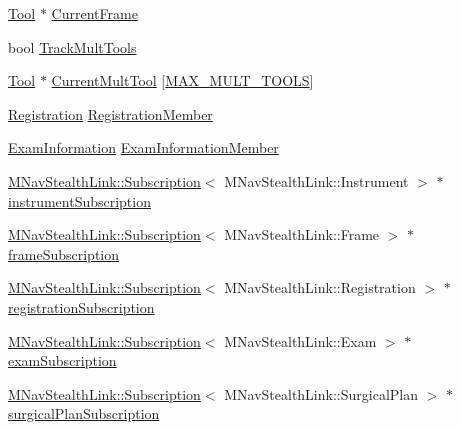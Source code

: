 \begin{DoxyCompactItemize}
\item 
\hyperlink{classmts_medtronic_stealthlink_1_1_tool}{Tool} $\ast$ \hyperlink{classmts_medtronic_stealthlink_a49aa0c7078f417253999302e19b67c8d}{Current\+Frame}
\item 
bool \hyperlink{classmts_medtronic_stealthlink_ac483f650c9ed1942194dbccca2c306d5}{Track\+Mult\+Tools}
\item 
\hyperlink{classmts_medtronic_stealthlink_1_1_tool}{Tool} $\ast$ \hyperlink{classmts_medtronic_stealthlink_a4e1f3377976ce273c64305dcfdbfe8c4}{Current\+Mult\+Tool} \mbox{[}\hyperlink{classmts_medtronic_stealthlink_aa6dc5e01ed985d6e4303bb84642387e6a2db20fb33f325a4d491d94d48829d57e}{M\+A\+X\+\_\+\+M\+U\+L\+T\+\_\+\+T\+O\+O\+L\+S}\mbox{]}
\item 
\hyperlink{classmts_medtronic_stealthlink_1_1_registration}{Registration} \hyperlink{classmts_medtronic_stealthlink_af3f0000b5a3e54cd33d8e133644c24eb}{Registration\+Member}
\item 
\hyperlink{classmts_medtronic_stealthlink_1_1_exam_information}{Exam\+Information} \hyperlink{classmts_medtronic_stealthlink_ab54f2ca3dd9279f65c616522695c43d3}{Exam\+Information\+Member}
\item 
\hyperlink{class_m_nav_stealth_link_1_1_subscription}{M\+Nav\+Stealth\+Link\+::\+Subscription}$<$ M\+Nav\+Stealth\+Link\+::\+Instrument $>$ $\ast$ \hyperlink{classmts_medtronic_stealthlink_a51d1dca84c09fff538413563f0bc3fd7}{instrument\+Subscription}
\item 
\hyperlink{class_m_nav_stealth_link_1_1_subscription}{M\+Nav\+Stealth\+Link\+::\+Subscription}$<$ M\+Nav\+Stealth\+Link\+::\+Frame $>$ $\ast$ \hyperlink{classmts_medtronic_stealthlink_a7498531aa89d4481e690d6a964f0de1e}{frame\+Subscription}
\item 
\hyperlink{class_m_nav_stealth_link_1_1_subscription}{M\+Nav\+Stealth\+Link\+::\+Subscription}$<$ M\+Nav\+Stealth\+Link\+::\+Registration $>$ $\ast$ \hyperlink{classmts_medtronic_stealthlink_a66aaac1496dacfa13dae52aec5b53be4}{registration\+Subscription}
\item 
\hyperlink{class_m_nav_stealth_link_1_1_subscription}{M\+Nav\+Stealth\+Link\+::\+Subscription}$<$ M\+Nav\+Stealth\+Link\+::\+Exam $>$ $\ast$ \hyperlink{classmts_medtronic_stealthlink_ae91000f8a40ee3468158a2b2bdd7ec5b}{exam\+Subscription}
\item 
\hyperlink{class_m_nav_stealth_link_1_1_subscription}{M\+Nav\+Stealth\+Link\+::\+Subscription}$<$ M\+Nav\+Stealth\+Link\+::\+Surgical\+Plan $>$ $\ast$ \hyperlink{classmts_medtronic_stealthlink_a341c6bd05bb61053f5b6ce6dde68f0b3}{surgical\+Plan\+Subscription}
\end{DoxyCompactItemize}
